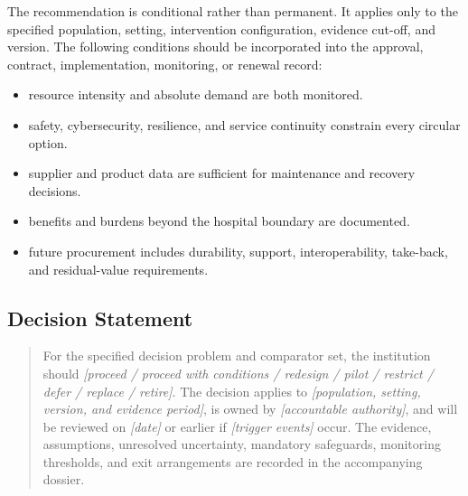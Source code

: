 The recommendation is conditional rather than permanent. It applies only to the
specified population, setting, intervention configuration, evidence cut-off, and
version. The following conditions should be incorporated into the approval,
contract, implementation, monitoring, or renewal record:

\begin{itemize}
 \item resource intensity and absolute demand are both monitored.
 \item safety, cybersecurity, resilience, and service continuity constrain every circular option.
 \item supplier and product data are sufficient for maintenance and recovery decisions.
 \item benefits and burdens beyond the hospital boundary are documented.
 \item future procurement includes durability, support, interoperability, take-back, and residual-value requirements.
\end{itemize}

\subsection{Decision Statement}
\begin{quote}
For the specified decision problem and comparator set, the institution should
\emph{[proceed / proceed with conditions / redesign / pilot / restrict / defer /
replace / retire]}. The decision applies to \emph{[population, setting, version,
and evidence period]}, is owned by \emph{[accountable authority]}, and will be
reviewed on \emph{[date]} or earlier if \emph{[trigger events]} occur. The
evidence, assumptions, unresolved uncertainty, mandatory safeguards, monitoring
thresholds, and exit arrangements are recorded in the accompanying dossier.
\end{quote}
